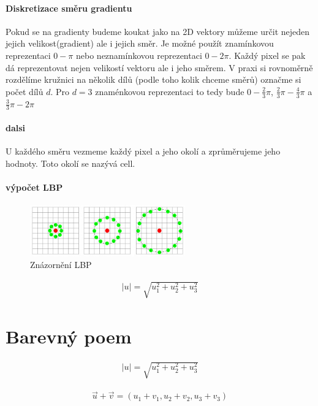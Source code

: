 \documentclass{report}
\begin{document}
\subsubsection{Diskretizace směru gradientu}
Pokud se na gradienty budeme koukat jako na 2D vektory můžeme určit nejeden jejich velikost(gradient) ale i jejich směr. Je možné použít znamínkovou reprezentaci $0 - \pi$ nebo neznamínkovou reprezentaci $0 - 2\pi$. Každý pixel se pak dá reprezentovat nejen velikostí vektoru ale i jeho směrem. V praxi si rovnoměrně rozdělíme kružnici na několik dílů (podle toho kolik chceme směrů) označme si počet dílů $d$. Pro $d = 3$ znaménkovou reprezentaci to tedy bude $0 - \frac{2}{3}\pi$, $\frac{2}{3}\pi - \frac{4}{3}\pi$ a $\frac{3}{3}\pi - 2\pi$ 

\subsubsection{dalsi}
U každého směru vezmeme každý pixel a jeho okolí a zprůměrujeme jeho hodnoty. Toto okolí se nazývá cell. 

\subsubsection{výpočet LBP}


\begin{figure}[ht]
		\centering
		\includegraphics[width=253px]{./img/poem.png}	
		\caption{Znázornění LBP}
\end{figure} \begin{align}
   \label{velikost_vektoru_v_prostoru} |u| = \sqrt{u_1^2 + u_2^2 + u_3^2}
\end{align} 
 
\chapter{Barevný poem}
\begin{align}
   \label{velikost_vektoru_v_prostoru} |u| = \sqrt{u_1^2 + u_2^2 + u_3^2}
\end{align} 

\begin{align}
   \label{soucet_vektrou} \vec{u} + \vec{v} = (u_1 + v_1, u_2 + v_2, u_3 + v_3 )
\end{align} 
 
\end{document}
